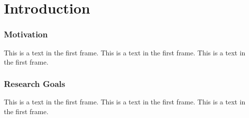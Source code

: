 \section{Introduction}
 
\begin{frame}
\frametitle{Motivation}
This is a text in the first frame. This is a text in the first frame. This is a text in the first frame.
\end{frame}

\begin{frame}
    \frametitle{Research Goals}
    This is a text in the first frame. This is a text in the first frame. This is a text in the first frame.
\end{frame}
